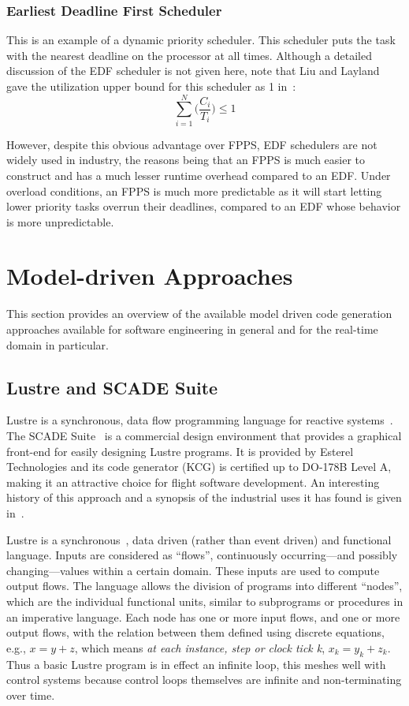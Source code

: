\subsubsection{Earliest Deadline First Scheduler}
This is an example of a dynamic priority scheduler. This scheduler
puts the task with the nearest deadline on the processor at all
times. Although a detailed discussion of the EDF scheduler is not
given here, note that Liu and Layland gave the utilization upper bound
for this scheduler as 1 in~\cite{liu@jacm73}:
\begin{displaymath}
\sum_{i=1}^N \bigg(\frac{C_i}{T_i}\bigg) \le 1
\end{displaymath}

However, despite this obvious advantage over FPPS, EDF schedulers are
not widely used in industry, the reasons being that an FPPS is much
easier to construct and has a much lesser runtime overhead compared to
an EDF. Under overload conditions, an FPPS is much more predictable as
it will start letting lower priority tasks overrun their deadlines,
compared to an EDF whose behavior is more unpredictable.

\section{Model-driven Approaches}
This section provides an overview of the available model driven code
generation approaches available for software engineering in general
and for the real-time domain in particular.

\subsection{Lustre and SCADE Suite}
Lustre is a synchronous, data flow programming language for reactive
systems~\cite{halbwachs@popl87, halbwachs@ieee91}. The SCADE
Suite~\cite{caspi@sigplan03} is a commercial design environment that
provides a graphical front-end for easily designing Lustre
programs. It is provided by Esterel Technologies and its code
generator (KCG) is certified up to DO-178B Level A, making it an
attractive choice for flight software development. An interesting
history of this approach and a synopsis of the industrial uses it has
found is given in~\cite{halbwachs@memocode05, halbwachs@ieee03}.

Lustre is a synchronous~\cite{halbwachs@ieee03}, data driven (rather
than event driven) and functional language. Inputs are considered as
``flows'', continuously occurring---and possibly changing---values
within a certain domain. These inputs are used to compute output
flows. The language allows the division of programs into different
``nodes'', which are the individual functional units, similar to
subprograms or procedures in an imperative language. Each node has one
or more input flows, and one or more output flows, with the relation
between them defined using discrete equations, e.g., $x = y + z$,
which means \emph{at each instance, step or clock tick k}, $x_k = y_k
+ z_k$. Thus a basic Lustre program is in effect an infinite loop,
this meshes well with control systems because control loops themselves
are infinite and non-terminating over time.


